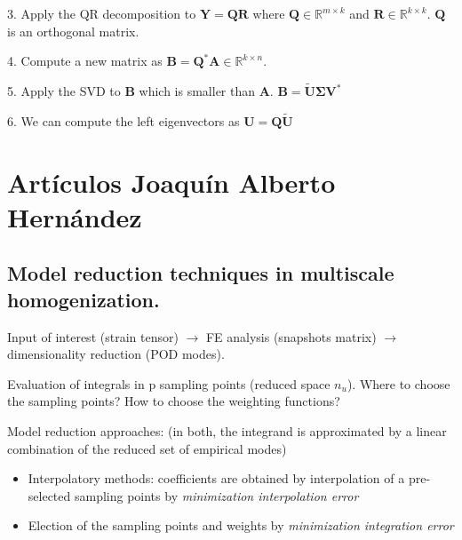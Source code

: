 \documentclass{article}
\begin{document}
3. Apply the QR decomposition to $\bm{Y} = \bm{Q} \bm{R}$ where $\bm{Q} \in \mathbb{R}^{m \times k}$ and $\bm{R} \in \mathbb{R}^{k \times k}$. $\bm{Q}$ is an orthogonal matrix. 


4. Compute a new matrix as $\bm{B} = \bm{Q}^*\bm{A} \in \mathbb{R}^{k \times n}$.

5. Apply the SVD to $\bm{B}$ which is smaller than $\bm{A}$. $\bm{B} = \bm{\tilde{U}}\bm{\Sigma}\bm{V}^*$

6. We can compute the left eigenvectors as $\bm{U} = \bm{Q}\bm{\tilde{U}}$


\section{Artículos Joaquín Alberto Hernández}

\subsection{Model reduction techniques in multiscale homogenization. \cite{hernandez14}}
Input of interest (strain tensor) $\rightarrow$ FE analysis (snapshots matrix) $\rightarrow$ dimensionality reduction (POD modes).\newline

Evaluation of integrals in p sampling points (reduced space $n_u$). Where to choose the sampling points? How to choose the weighting functions? \newline

Model reduction approaches: (in both, the integrand is approximated by a linear combination of the reduced set of empirical modes)
\begin{itemize}
  \item Interpolatory methods: coefficients are obtained by interpolation of a pre-selected sampling points by \textit{minimization interpolation error}
  \item Election of the sampling points and weights by \textit{minimization integration error}
\end{itemize}
\end{document}
